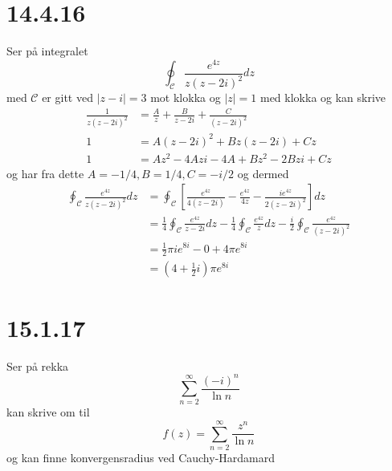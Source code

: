 \documentclass{report}
\newcommand{\nbrack}[1]{\left( #1 \right)}
\newcommand{\bbrack}[1]{\left[ #1 \right]}
\begin{document}
\section*{14.4.16}
Ser på integralet
\begin{equation}
  \label{eq:16}
  \oint_{\mathcal{C}} \frac{e^{4z}}{z(z-2i)^{2}} dz
\end{equation}
med $\mathcal{C}$ er gitt ved $|z-i| = 3$ mot klokka og $|z| = 1$ med klokka og kan skrive
\begin{equation}
  \label{eq:17}
  \begin{split}
    \frac{1}{z(z-2i)^{2}} &= \frac{A}{z} + \frac{B}{z-2i} + \frac{C}{(z-2i)^{2}} \\
    1 &= A(z-2i)^{2} + Bz(z-2i) + Cz \\
    1 &= Az^{2} - 4Azi - 4A + Bz^{2} - 2Bzi + Cz
  \end{split}
\end{equation}
og har fra dette $A = -1/4, B = 1/4, C = -i/2$ og dermed
\begin{equation}
  \label{eq:18}
  \begin{split}
    \oint_{\mathcal{C}} \frac{e^{4z}}{z(z-2i)^{2}}dz
    &= \oint_{\mathcal{C}} \bbrack{ \frac{e^{4z}}{4(z-2i)} - \frac{e^{4z}}{4z} - \frac{ie^{4z}}{2(z-2i)^{2}}} dz \\
    &= \frac{1}{4} \oint_{\mathcal{C}} \frac{e^{4z}}{z-2i} dz - \frac{1}{4} \oint_{\mathcal{C}} \frac{e^{4z}}{z} dz - \frac{i}{2} \oint_{\mathcal{C}} \frac{e^{4z}}{(z-2i)^{2}} \\
    &= \frac{1}{2} \pi i e^{8i} - 0 + 4\pi e^{8i} \\
    &= \nbrack{ 4 + \frac{1}{2}i }\pi e^{8i}
  \end{split}
\end{equation}


\section*{15.1.17}
Ser på rekka
\begin{equation}
  \label{eq:19}
  \sum_{n=2}^{\infty} \frac{(-i)^{n}}{\ln n}
\end{equation}
kan skrive om til
\begin{equation}
  \label{eq:20}
  f(z) = \sum_{n=2}^{\infty} \frac{z^{n}}{\ln n}
\end{equation}
og kan finne konvergensradius ved Cauchy-Hardamard
\end{document}

